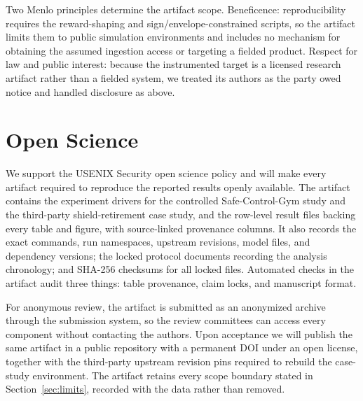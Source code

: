 Two Menlo principles determine the artifact scope.  Beneficence:
reproducibility requires the reward-shaping and sign/envelope-constrained
scripts, so the artifact limits them to public simulation environments and
includes no mechanism for obtaining the assumed ingestion access or targeting
a fielded product.
Respect for law and public interest: because the instrumented target is a
licensed research artifact rather than a fielded system, we treated its
authors as the party owed notice and handled disclosure as above.

\section*{Open Science}

We support the USENIX Security open science policy and will make every
artifact required to reproduce the reported results openly available.  The
artifact contains the experiment drivers for the controlled Safe-Control-Gym
study and the third-party shield-retirement case study, and the row-level
result files backing every table and figure, with source-linked provenance
columns.  It also records the exact commands, run namespaces, upstream
revisions, model files, and dependency versions; the locked protocol documents
recording the analysis chronology; and SHA-256 checksums for all locked files.
Automated checks in the artifact audit three things: table provenance, claim
locks, and manuscript format.

For anonymous review, the artifact is submitted as an anonymized archive
through the submission system, so the review committees can access every
component without contacting the authors.  Upon acceptance we will publish the
same artifact in a public repository with a permanent DOI under an open
license, together with the third-party upstream revision pins required to
rebuild the case-study environment.  The artifact retains every scope boundary stated in
Section~\ref{sec:limits}, recorded with the data rather than removed.
